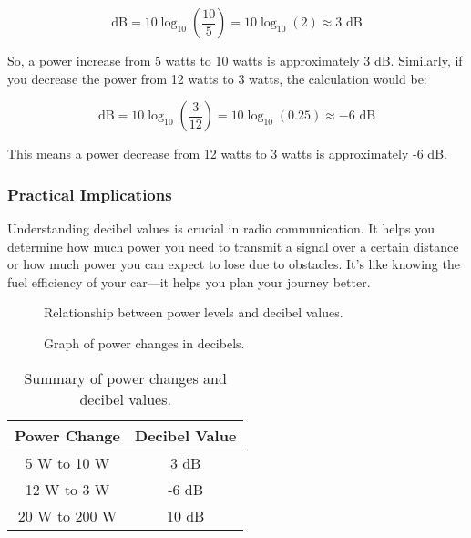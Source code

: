 \[
\text{dB} = 10 \log_{10}\left(\frac{10}{5}\right) = 10 \log_{10}(2) \approx 3 \text{ dB}
\]

So, a power increase from 5 watts to 10 watts is approximately 3 dB. Similarly, if you decrease the power from 12 watts to 3 watts, the calculation would be:

\[
\text{dB} = 10 \log_{10}\left(\frac{3}{12}\right) = 10 \log_{10}(0.25) \approx -6 \text{ dB}
\]

This means a power decrease from 12 watts to 3 watts is approximately -6 dB.

\subsubsection*{Practical Implications}
Understanding decibel values is crucial in radio communication. It helps you determine how much power you need to transmit a signal over a certain distance or how much power you can expect to lose due to obstacles. It's like knowing the fuel efficiency of your car—it helps you plan your journey better.

\begin{figure}[h]
    \centering
    \caption{Relationship between power levels and decibel values.}
    \label{fig:power-db-relationship}
\end{figure}

\begin{figure}[h]
    \centering
    \caption{Graph of power changes in decibels.}
    \label{fig:power-db-graph}
\end{figure}

\begin{table}[h]
    \centering
    \begin{tabular}{|c|c|}
    \hline
    \textbf{Power Change} & \textbf{Decibel Value} \\
    \hline
    5 W to 10 W & 3 dB \\
    12 W to 3 W & -6 dB \\
    20 W to 200 W & 10 dB \\
    \hline
    \end{tabular}
    \caption{Summary of power changes and decibel values.}
    \label{tab:power-db-summary}
\end{table}

